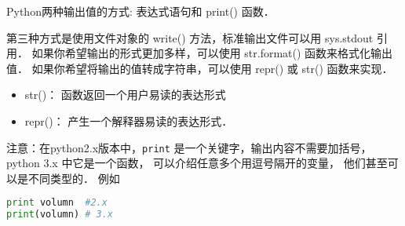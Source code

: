 
\begin{issues}
\issueTODO
\issueDraft
\end{issues}

Python两种输出值的方式: 表达式语句和 print() 函数．
    
第三种方式是使用文件对象的 write() 方法，标准输出文件可以用 sys.stdout 引用．
如果你希望输出的形式更加多样，可以使用 str.format() 函数来格式化输出值．
如果你希望将输出的值转成字符串，可以使用 repr() 或 str() 函数来实现．

\begin{itemize}
\item str()： 函数返回一个用户易读的表达形式
\item repr()： 产生一个解释器易读的表达形式．
\end{itemize}

注意：在python2.x版本中，\verb|print| 是一个关键字，输出内容不需要加括号， python 3.x 中它是一个函数， 可以介绍任意多个用逗号隔开的变量， 他们甚至可以是不同类型的． 例如
\begin{lstlisting}[language=python]
print volumn  #2.x
print(volumn) # 3.x
\end{lstlisting}
